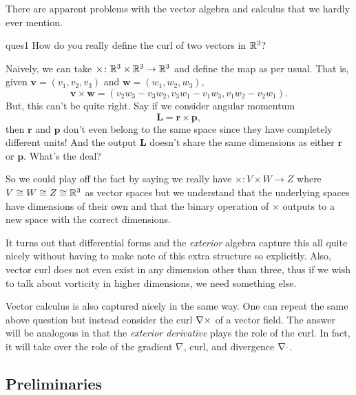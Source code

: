 There are apparent problems with the vector algebra and calculus that we hardly ever mention.  
\begin{ques}{}{ques1}
    How do you really define the curl of two vectors in $\mathbb{R}^3$?
    \tcblower
    \begin{answer*}
    Naively, we can take $\times \colon \mathbb{R}^3 \times \mathbb{R}^3 \to \mathbb{R}^3$ and define the map as per usual.  That is, given $\mathbf{v}=(v_1,v_2,v_3)$ and $\mathbf{w}=(w_1,w_2,w_3)$,
    \[
    \mathbf{v}\times \mathbf{w} = (v_2w_3-v_3w_2,v_3w_1-v_1w_3,v_1w_2-v_2w_1).
    \]
    But, this can't be quite right.  Say if we consider angular momentum 
    \[
    \mathbf{L}=\mathbf{r}\times \mathbf{p},
    \]
    then $\mathbf{r}$ and $\mathbf{p}$ don't even belong to the same space since they have completely different units! And the output $\mathbf{L}$ doesn't share the same dimensions as either $\mathbf{r}$ or $\mathbf{p}$. What's the deal?
    
    So we could play off the fact by saying we really have $\times \colon V \times W \to Z$ where $V\cong W \cong Z \cong \mathbb{R}^3$ as vector spaces but we understand that the underlying spaces have dimensions of their own and that the binary operation of $\times$ outputs to a new space with the correct dimensions. 
    \end{answer*}
\end{ques}



It turns out that differential forms and the \emph{exterior} algebra capture this all quite nicely without having to make note  of this extra structure so explicitly.  Also, vector curl does not even exist in any dimension other than three, thus if we wish to talk about vorticity in higher dimensions, we need something else.

Vector calculus is also captured nicely in the same way. One can repeat the same above question but instead consider the curl $\nabla \times$ of a vector field.  The answer will be analogous in that the \emph{exterior derivative} plays the role of the curl.  In fact, it will take over the role of the gradient $\nabla$, curl, and divergence $\nabla \cdot$.

\subsection{Preliminaries}

